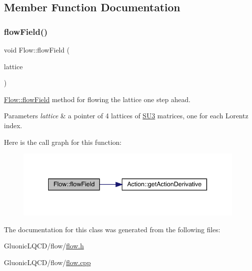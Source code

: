 \subsection{Member Function Documentation}
\mbox{\label{class_flow_a284b490ddedc9cf5d0f2ab0660c328f6}} 
\subsubsection{\texorpdfstring{flowField()}{flowField()}}
{\footnotesize\ttfamily void Flow\+::flow\+Field (\begin{DoxyParamCaption}\item[{\mbox{\hyperlink{class_lattice}{Lattice}}$<$ \mbox{\hyperlink{class_s_u3}{S\+U3}} $>$ $\ast$}]{lattice }\end{DoxyParamCaption})}



\mbox{\hyperlink{class_flow_a284b490ddedc9cf5d0f2ab0660c328f6}{Flow\+::flow\+Field}} method for flowing the lattice one step ahead. 


\begin{DoxyParams}{Parameters}
{\em lattice} & a pointer of 4 lattices of \mbox{\hyperlink{class_s_u3}{S\+U3}} matrices, one for each Lorentz index. \\
\hline
\end{DoxyParams}
Here is the call graph for this function\+:\nopagebreak
\begin{figure}[H]
\begin{center}
\leavevmode
\includegraphics[width=334pt]{class_flow_a284b490ddedc9cf5d0f2ab0660c328f6_cgraph}
\end{center}
\end{figure}


The documentation for this class was generated from the following files\+:\begin{DoxyCompactItemize}
\item 
Gluonic\+L\+Q\+C\+D/flow/\mbox{\hyperlink{flow_8h}{flow.\+h}}\item 
Gluonic\+L\+Q\+C\+D/flow/\mbox{\hyperlink{flow_8cpp}{flow.\+cpp}}\end{DoxyCompactItemize}
